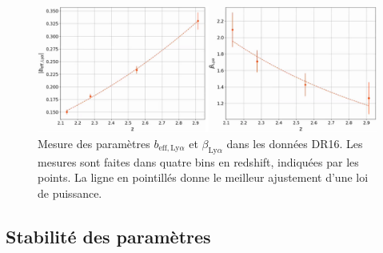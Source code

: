 \documentclass[11pt, twoside, a4paper, openright]{report}
\begin{document}
\begin{figure}
  \centering
  \includegraphics[scale=0.44]{bias_vs_z}
  \caption{Mesure des paramètres $b_{\mathrm{eff},\mathrm{Ly}\alpha}$ et $\beta_{\mathrm{Ly}\alpha}$ dans les données DR16. Les mesures sont faites dans quatre bins en redshift, indiquées par les points. La ligne en pointillés donne le meilleur ajustement d'une loi de puissance.}
  \label{fig:bias_vs_z}
\end{figure}





\subsection{Stabilité des paramètres \lya{}}
\label{subsec:stab_pars_lya}
\end{document}
